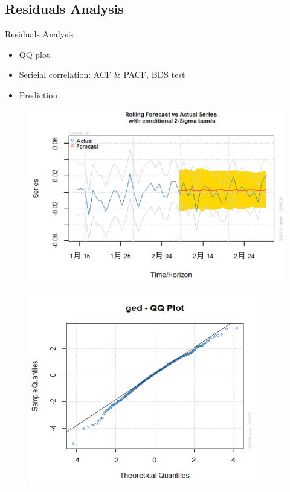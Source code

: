 \documentclass{beamer}
\begin{document}
\subsection{Residuals Analysis}
\begin{frame}{Residuals Analysis}
  \begin{itemize}
    \item QQ-plot
    \item Serieial correlation: ACF \& PACF, BDS test
    \item Prediction
  \end{itemize}

  \begin{figure}[bp]
    \centering
    \begin{minipage}[t]{0.53\columnwidth}
      \flushleft
      \includegraphics[width=1\columnwidth]{fig/Rolling forecast.png}
      \label{fig:Rolling forecast plot} 
    \end{minipage}
    \begin{minipage}[t]{0.45\columnwidth}
      \flushright
      \includegraphics[width=\columnwidth]{fig/ged-qq-plot.png}
      \label{fig:ged qq plot} 
    \end{minipage}
  \end{figure}
\end{frame}
\end{document}
